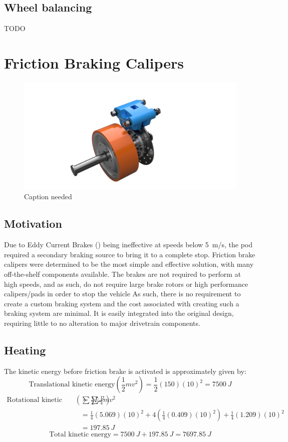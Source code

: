\documentclass[main.tex]{subfiles}
\begin{document}
    \subsection{Wheel balancing}
    TODO
    \section{Friction Braking Calipers}
    \label{sec:friction-braking-calipers}
    \begin{figure}[H]
        \centering
        \includegraphics[width=\linewidth]{images/fig23}
        \caption{Caption needed}
    \end{figure}

    \subsection{Motivation}
    Due to Eddy Current Brakes () being ineffective at speeds below \SI{5}{m/s}, the pod required a secondary braking source to bring it to a complete stop. Friction brake calipers were determined to be the most simple and effective solution, with many off-the-shelf components available. The brakes are not required to perform at high speeds, and as such, do not require large brake rotors or high performance calipers/pads in order to stop the vehicle  As such, there is no requirement to create a custom braking system and the cost associated with creating such a braking system are minimal. It is easily integrated into the original design, requiring little to no alteration to major drivetrain components.\\

    \subsection{Heating}
    The kinetic energy before friction brake is activated is approximately given by:\\
    \[
    	\textrm{Translational kinetic energy} \left(\frac{1}{2}mv^2\right) =\frac{1}{2}(150)(10)^2=\SI{7500}{J}
    \]
    \begin{align*}
	\textrm{Rotational kinetic energy} \left(\sum\frac{1}{2}I{\omega}^2\right)&=\sum\frac{1}{4}mv^2 \\
    &= \frac{1}{4}(5.069)(10)^2 + 4\left(\frac{1}{4}(0.409)(10)^2\right) + \frac{1}{4}(1.209)(10)^2\\
    &= \SI{197.85}{J}
    \end{align*}
    \[
    	\textrm{Total kinetic energy} = \SI{7500}{J} + \SI{197.85}{J} = \SI{7697.85}{J}
    \]
    
\end{document}
